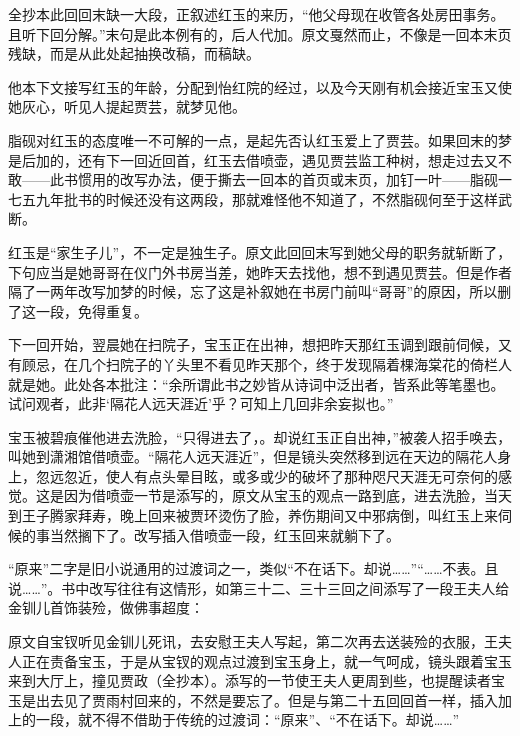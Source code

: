 \par 全抄本此回回末缺一大段，正叙述红玉的来历，“他父母现在收管各处房田事务。且听下回分解。”末句是此本例有的，后人代加。原文戛然而止，不像是一回本末页残缺，而是从此处起抽换改稿，而稿缺。
\par 他本下文接写红玉的年龄，分配到怡红院的经过，以及今天刚有机会接近宝玉又使她灰心，听见人提起贾芸，就梦见他。
\par 脂砚对红玉的态度唯一不可解的一点，是起先否认红玉爱上了贾芸。如果回末的梦是后加的，还有下一回近回首，红玉去借喷壶，遇见贾芸监工种树，想走过去又不敢——此书惯用的改写办法，便于撕去一回本的首页或末页，加钉一叶——脂砚一七五九年批书的时候还没有这两段，那就难怪他不知道了，不然脂砚何至于这样武断。
\par 红玉是“家生子儿”，不一定是独生子。原文此回回末写到她父母的职务就斩断了，下句应当是她哥哥在仪门外书房当差，她昨天去找他，想不到遇见贾芸。但是作者隔了一两年改写加梦的时候，忘了这是补叙她在书房门前叫“哥哥”的原因，所以删了这一段，免得重复。
\par 下一回开始，翌晨她在扫院子，宝玉正在出神，想把昨天那红玉调到跟前伺候，又有顾忌，在几个扫院子的丫头里不看见昨天那个，终于发现隔着棵海棠花的倚栏人就是她。此处各本批注：“余所谓此书之妙皆从诗词中泛出者，皆系此等笔墨也。试问观者，此非‘隔花人远天涯近’乎？可知上几回非余妄拟也。”
\par 宝玉被碧痕催他进去洗脸，“只得进去了，。却说红玉正自出神，”被袭人招手唤去，叫她到潇湘馆借喷壶。“隔花人远天涯近”，但是镜头突然移到远在天边的隔花人身上，忽远忽近，使人有点头晕目眩，或多或少的破坏了那种咫尺天涯无可奈何的感觉。这是因为借喷壶一节是添写的，原文从宝玉的观点一路到底，进去洗脸，当天到王子腾家拜寿，晚上回来被贾环烫伤了脸，养伤期间又中邪病倒，叫红玉上来伺候的事当然搁下了。改写插入借喷壶一段，红玉回来就躺下了。
\par “原来”二字是旧小说通用的过渡词之一，类似“不在话下。却说……”“……不表。且说……”。书中改写往往有这情形，如第三十二、三十三回之间添写了一段王夫人给金钏儿首饰装殓，做佛事超度：
\par 原文自宝钗听见金钏儿死讯，去安慰王夫人写起，第二次再去送装殓的衣服，王夫人正在责备宝玉，于是从宝钗的观点过渡到宝玉身上，就一气呵成，镜头跟着宝玉来到大厅上，撞见贾政（全抄本）。添写的一节使王夫人更周到些，也提醒读者宝玉是出去见了贾雨村回来的，不然是要忘了。但是与第二十五回回首一样，插入加上的一段，就不得不借助于传统的过渡词：“原来”、“不在话下。却说……”
